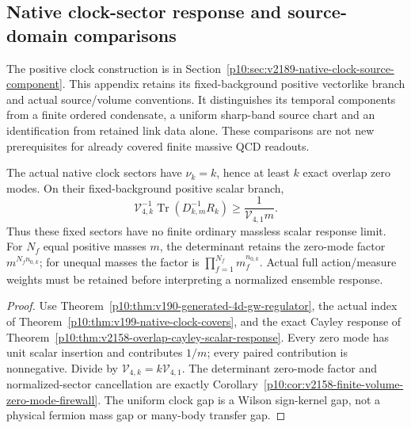 \documentclass[12pt,a4paper]{article}
\begin{document}
\subsection{Native clock-sector response and source-domain comparisons}
\label{p10:app:v2189-native-clock-comparison}

The positive clock construction is in
Section~\ref{p10:sec:v2189-native-clock-source-component}.
This appendix retains its fixed-background positive vectorlike branch and
actual source/volume conventions. It distinguishes its temporal components
from a finite ordered condensate, a uniform sharp-band source chart and an
identification from retained link data alone. These comparisons are not new
prerequisites for already covered finite massive QCD readouts.

\begin{proposition}
\label{p10:prop:v2189-clock-zero-mode-scope}
The actual native clock sectors have $\nu_k=k$, hence at least $k$ exact
overlap zero modes. On their fixed-background positive scalar branch,
\[
 \mathcal V_{4,k}^{-1}\operatorname{Tr}(D_{k,m}^{-1}R_k)
 \ge\frac1{\mathcal V_{4,1}m}.
\]
Thus these fixed sectors have no finite ordinary massless scalar response
limit. For $N_f$ equal positive masses $m$, the determinant retains the
zero-mode factor $m^{N_fn_{0,k}}$; for unequal masses the factor is
$\prod_{f=1}^{N_f}m_f^{n_{0,k}}$. Actual full action/measure weights must
be retained before interpreting a normalized ensemble response.
\end{proposition}
\begin{proof}
Use Theorem~\ref{p10:thm:v190-generated-4d-gw-regulator}, the actual
index of Theorem~\ref{p10:thm:v199-native-clock-covers}, and the exact
Cayley response of
Theorem~\ref{p10:thm:v2158-overlap-cayley-scalar-response}.
Every zero mode has unit scalar insertion and contributes $1/m$; every
paired contribution is nonnegative. Divide by
$\mathcal V_{4,k}=k\mathcal V_{4,1}$.
The determinant zero-mode factor and normalized-sector cancellation are
exactly Corollary~\ref{p10:cor:v2158-finite-volume-zero-mode-firewall}.
The uniform clock gap is a Wilson sign-kernel gap, not a physical fermion
mass gap or many-body transfer gap.
\end{proof}


\end{document}
